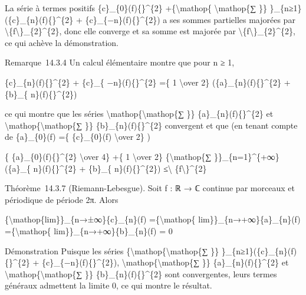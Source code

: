\documentclass[]{article}
\begin{document}
La série à termes positifs
\textbar{}\{c\}\_\{0\}(f)\{\textbar{}\}\^{}\{2\}
+\{\textbackslash{}mathop\{ \textbackslash{}mathop\{∑ \}\}
\}\_\{n≥1\}(\textbar{}\{c\}\_\{n\}(f)\{\textbar{}\}\^{}\{2\} +
\textbar{}\{c\}\_\{−n\}(f)\{\textbar{}\}\^{}\{2\}) a ses sommes
partielles majorées par
\textbackslash{}\textbar{}\{f\textbackslash{}\textbar{}\}\_\{2\}\^{}\{2\},
donc elle converge et sa somme est majorée par
\textbackslash{}\textbar{}\{f\textbackslash{}\textbar{}\}\_\{2\}\^{}\{2\},
ce qui achève la démonstration.

Remarque~14.3.4 Un calcul élémentaire montre que pour n ≥ 1,

\textbar{}\{c\}\_\{n\}(f)\{\textbar{}\}\^{}\{2\} + \textbar{}\{c\}\_\{
−n\}(f)\{\textbar{}\}\^{}\{2\} =\{ 1 \textbackslash{}over 2\}
(\textbar{}\{a\}\_\{n\}(f)\{\textbar{}\}\^{}\{2\} + \textbar{}\{b\}\_\{
n\}(f)\{\textbar{}\}\^{}\{2\})

ce qui montre que les séries
\textbackslash{}mathop\{\textbackslash{}mathop\{∑ \}\}
\textbar{}\{a\}\_\{n\}(f)\{\textbar{}\}\^{}\{2\} et
\textbackslash{}mathop\{\textbackslash{}mathop\{∑ \}\}
\textbar{}\{b\}\_\{n\}(f)\{\textbar{}\}\^{}\{2\} convergent et que (en
tenant compte de \{a\}\_\{0\}(f) =\{ \{c\}\_\{0\}(f)
\textbackslash{}over 2\} )

\{ \textbar{}\{a\}\_\{0\}(f)\{\textbar{}\}\^{}\{2\} \textbackslash{}over
4\} +\{ 1 \textbackslash{}over 2\} \{\textbackslash{}mathop\{∑
\}\}\_\{n=1\}\^{}\{+∞\}(\textbar{}\{a\}\_\{
n\}(f)\{\textbar{}\}\^{}\{2\} + \textbar{}\{b\}\_\{
n\}(f)\{\textbar{}\}\^{}\{2\}) ≤\textbackslash{}\textbar{}
\{f\textbackslash{}\textbar{}\}\^{}\{2\}

Théorème~14.3.7 (Riemann-Lebesgue). Soit f : ℝ → ℂ continue par morceaux
et périodique de période 2π. Alors

\{\textbackslash{}mathop\{lim\}\}\_\{n→±∞\}\{c\}\_\{n\}(f)
=\{\textbackslash{}mathop\{ lim\}\}\_\{n→+∞\}\{a\}\_\{n\}(f)
=\{\textbackslash{}mathop\{ lim\}\}\_\{n→+∞\}\{b\}\_\{n\}(f) = 0

Démonstration Puisque les séries
\{\textbackslash{}mathop\{\textbackslash{}mathop\{∑ \}\}
\}\_\{n≥1\}(\textbar{}\{c\}\_\{n\}(f)\{\textbar{}\}\^{}\{2\} +
\textbar{}\{c\}\_\{−n\}(f)\{\textbar{}\}\^{}\{2\}),
\textbackslash{}mathop\{\textbackslash{}mathop\{∑ \}\}
\textbar{}\{a\}\_\{n\}(f)\{\textbar{}\}\^{}\{2\} et
\textbackslash{}mathop\{\textbackslash{}mathop\{∑ \}\}
\textbar{}\{b\}\_\{n\}(f)\{\textbar{}\}\^{}\{2\} sont convergentes,
leurs termes généraux admettent la limite 0, ce qui montre le résultat.
\end{document}
